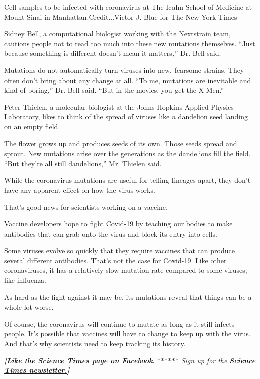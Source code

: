 Cell samples to be infected with coronavirus at The Icahn School of
Medicine at Mount Sinai in Manhattan.Credit...Victor J. Blue for The New
York Times

Sidney Bell, a computational biologist working with the Nextstrain team,
cautions people not to read too much into these new mutations
themselves. ``Just because something is different doesn't mean it
matters,'' Dr. Bell said.

Mutations do not automatically turn viruses into new, fearsome strains.
They often don't bring about any change at all. ``To me, mutations are
inevitable and kind of boring,'' Dr. Bell said. ``But in the movies, you
get the X-Men.''

Peter Thielen, a molecular biologist at the Johns Hopkins Applied
Physics Laboratory, likes to think of the spread of viruses like a
dandelion seed landing on an empty field.

The flower grows up and produces seeds of its own. Those seeds spread
and sprout. New mutations arise over the generations as the dandelions
fill the field. ``But they're all still dandelions,'' Mr. Thielen said.

While the coronavirus mutations are useful for telling lineages apart,
they don't have any apparent effect on how the virus works.

That's good news for scientists working on a vaccine.

Vaccine developers hope to fight Covid-19 by teaching our bodies to make
antibodies that can grab onto the virus and block its entry into cells.

Some viruses evolve so quickly that they require vaccines that can
produce several different antibodies. That's not the case for Covid-19.
Like other coronaviruses, it has a relatively slow mutation rate
compared to some viruses, like influenza.

As hard as the fight against it may be, its mutations reveal that things
can be a whole lot worse.

Of course, the coronavirus will continue to mutate as long as it still
infects people. It's possible that vaccines will have to change to keep
up with the virus. And that's why scientists need to keep tracking its
history.

\textbf{\emph{{[}}\href{http://on.fb.me/1paTQ1h}{\emph{Like the Science
Times page on Facebook.}}} ****** \emph{\textbar{} Sign up for the}
\textbf{\href{http://nyti.ms/1MbHaRU}{\emph{Science Times
newsletter.}}\emph{{]}}}

